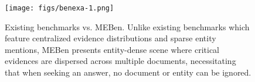 \begin{figure}[t!]
\begin{center}
\texttt{[image: figs/benexa-1.png]}
\end{center}
\caption{Existing benchmarks vs. MEBen. Unlike existing benchmarks which feature centralized evidence distributions and sparse entity mentions, MEBen presents entity-dense scene where critical evidences are dispersed across multiple documents, necessitating that when seeking an answer, no document or entity can be ignored.}
\label{fig:benexa}
\end{figure}






